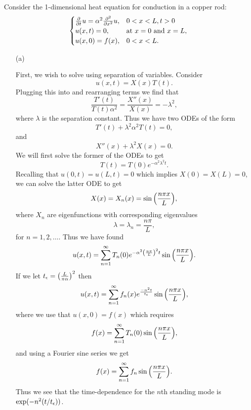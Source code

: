 \documentclass[12pt]{report}
\begin{document}
\begin{solution}
    
    \noindent
    Consider the 1-dimensional heat equation for conduction in a copper rod:
    \begin{equation}\label{1}
        \begin{cases}
            \frac{\partial }{\partial t}u = \alpha^2 \frac{\partial^{2} }{\partial x^{2}}u, &0<x<L,t>0\\
            u(x,t) = 0, &\text{at}~x=0 {~\text{and}~} x=L,\\
            u(x,0) = f(x), &0 < x < L.
        \end{cases}
    \end{equation}
    \begin{enumerate}
        \item [(a)]
        
        \noindent
        First, we wish to solve  using separation of variables. Consider
        \[
            u(x,t) = X(x)T(t).
        \] 
        Plugging this into  and rearranging terms we find that
        \[
            \frac{T'(t)}{T(t)\alpha^2} = \frac{X''(x)}{X(x)} = - \lambda^2, 
        \]
        where $\lambda$ is the separation constant. Thus we have two ODEs of the form
        \[
            T'(t) + \lambda^2\alpha^2T(t) = 0,
        \] 
        and
        \[
            X''(x) + \lambda^2 X(x) = 0.
        \]
        We will first solve the former of the ODEs to get
        \[
            T(t) = T(0)e^{-\alpha^2\lambda^2t}.
        \]
        Recalling that $u(0,t) = u(L,t) = 0$ which implies $X(0) = X(L) = 0$, we can solve the latter ODE to get
        \[
            X(x) = X_n(x) = \sin{\left(\frac{n \pi x}{L}\right)},
        \] 
        where $X_n$ are eigenfunctions with corresponding eigenvalues
        \[
            \lambda = \lambda_n  = \frac{n\pi}{L},
        \] 
        for $n = 1,2,\dots$. Thus we have found
        \[
            u(x,t) = \sum_{n=1}^{\infty} T_n(0)e^{-\alpha^2{\left(\frac{n\pi}{L}\right)}^2t} \sin{\left(\frac{n \pi x}{L}\right)}. 
        \]
        If we let $t_{\epsilon} = {\left(\frac{L}{\pi \alpha}\right)}^2$ then 
        \[
            u(x,t) = \sum_{n=1}^{\infty} f_n(x) e^{\frac{-n^2 t}{t_{\epsilon}}} \sin{\left(\frac{n \pi x}{L}\right)},
        \]
        where we use that $u(x,0) = f(x)$ which requires
        \[
            f(x) = \sum_{n=1}^\infty T_n(0) \sin{\left(\frac{n \pi x}{L}\right)},
        \]
        and using a Fourier sine series we get
        \[
            f(x) = \sum_{n=1}^\infty f_n \sin{\left(\frac{n \pi x}{L}\right)}.
        \]
        Thus we see that the time-dependence for the $n$th standing mode is $\text{exp}(-n^2(t/t_{\epsilon}))$.



\end{enumerate}
\end{solution}
\end{document}
